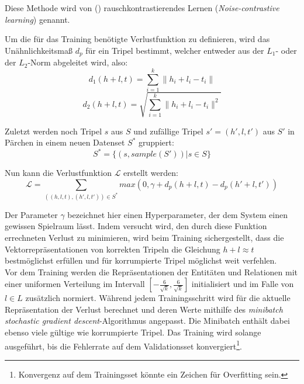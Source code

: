Diese Methode wird von (\cite{bordes2013translating}) rauschkontrastierendes Lernen (\emph{Noise-contrastive learning})
genannt.

Um die für das Training benötigte Verlustfunktion zu definieren, wird das Unähnlichkeitsmaß $d_p$ für ein Tripel bestimmt, welcher
entweder aus der $L_1$- oder der $L_2$-Norm abgeleitet wird, also:
\begin{equation}
    d_1(h + l, t) = \sum_{i=1}^k \| h_i + l_i - t_i \|
\end{equation}
\begin{equation}
    d_2(h + l, t) = \sqrt{\sum_{i=1}^k \| h_i + l_i - t_i \|^2}
\end{equation}

Zuletzt werden noch Tripel $s$ aus $S$ und zufällige Tripel $s'=(h', l, t')$ aus $S'$ in Pärchen in einem neuen Datenset $S^*$ gruppiert:
\begin{equation}
  S^* = \{(s, sample(S'))| s \in S\}
\end{equation}

Nun kann die Verlustfunktion $\mathcal{L}$ erstellt werden:
\begin{equation}\label{form:lossf}
  \mathcal{L} = \sum_{((h,l,t), (h', l, t')) \in S^*} max(0, \gamma + d_p(h + l, t) - d_p(h' + l, t'))
\end{equation}

Der Parameter $\gamma$ bezeichnet hier einen Hyperparameter, der dem System einen gewissen Spielraum lässt. Indem versucht
wird, den durch diese Funktion errechneten Verlust zu minimieren, wird beim Training sichergestellt, dass die Vektorrepräsentationen
von korrekten Tripeln die Gleichung $h + l \approx t$ bestmöglichst erfüllen und für korrumpierte Tripel möglichst weit
verfehlen.\\

Vor dem Training werden die Repräsentationen der Entitäten und Relationen mit einer uniformen Verteilung im Intervall
$[-\frac{6}{\sqrt{k}}, \frac{6}{\sqrt{k}}]$ initialisiert und im Falle von $l \in L$ zusätzlich normiert. Während jedem
Trainingsschritt wird für die aktuelle Repräsentation der Verlust berechnet und deren Werte mithilfe des
\emph{minibatch stochastic gradient descent}-Algorithmus angepasst. Die Minibatch enthält dabei ebenso viele gültige wie korrumpierte Tripel.
Das Training wird solange ausgeführt, bis die Fehlerrate auf dem Validationsset konvergiert\footnote{Konvergenz auf dem
Trainingsset könnte ein Zeichen für Overfitting sein.}.\\

